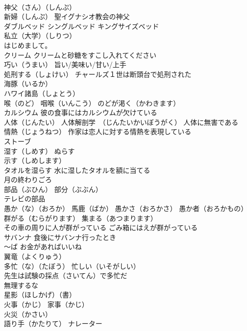 \documentclass[8pt]{extreport}
\begin{document}
\begin{CJK}{UTF8}{min}
\\	神父（さん）（しんぷ） 
\\	新婦（しんぷ） 聖イグナシオ教会の神父
\\	ダブルベッド シングルベッド キングサイズベッド
\\	私立（大学）（しりつ）
\\	はじめまして。
\\	クリーム クリームと砂糖をすこし入れてください
\\	巧い（うまい） 旨い/美味い/甘い/上手 
\\	処刑する（しょけい） チャールズ１世は断頭台で処刑された
\\	海豚（いるか）
\\	ハワイ諸島（しょとう）
\\	喉（のど） 咽喉（いんこう） のどが渇く（かわきます）
\\	カルシウム 彼の食事にはカルシウムが欠けている
\\	人体（じんたい） 人体解剖学　（じんたいかいぼうがく） 人体に無害である
\\	情熱（じょうねつ） 作家は恋人に対する情熱を表現している
\\	ストーブ
\\	湿す（しめす） ぬらす 
\\	示す（しめします）
\\	タオルを湿らす 水に湿したタオルを額に当てる
\\	月の終わりごろ
\\	部品（ぶひん） 部分（ぶぶん）
\\	テレビの部品
\\	愚か（な）（おろか） 馬鹿（ばか） 愚かさ（おろかさ） 愚か者（おろかもの）
\\	群がる（むらがります） 集まる（あつまります）
\\	その車の周りに人が群がっている ごみ箱にはえが群がっている
\\	サバンナ 食後にサバンナ行ったとき
\\	～ば お金があればいいね
\\	翼竜（よくりゅう）
\\	多忙（な）（たぼう） 忙しい（いそがしい） 
\\	先生は試験の採点（さいてん）で多忙だ
\\	無理するな
\\	星影（ほしかげ）（書）
\\	火事（かじ） 家事（かじ） 
\\	火災（かさい）
\\	語り手（かたりて） ナレーター

\end{CJK}
\end{document}
